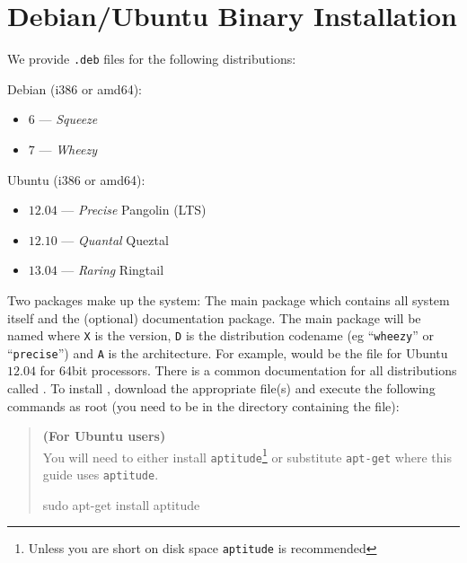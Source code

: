 %
%
%



\chapter{Debian/Ubuntu Binary Installation}\label{chap:bin}

We provide \texttt{.deb} files for the following distributions:

Debian (i386 or amd64):
\begin{itemize}
 \item $6$ --- \emph{Squeeze}
 \item $7$ --- \emph{Wheezy}
\end{itemize}

Ubuntu (i386 or amd64):
\begin{itemize}
 \item $12.04$ --- \emph{Precise} Pangolin (LTS)
 \item $12.10$ --- \emph{Quantal} Queztal 
 \item $13.04$ --- \emph{Raring} Ringtail
\end{itemize}

Two packages make up the \escript system:
The main package which contains all system itself and the (optional) documentation package.
The main package will be named  where \texttt{X} is the version, \texttt{D} 
is the distribution codename (eg ``\texttt{wheezy}'' or ``\texttt{precise}'') and \texttt{A} is the architecture.
For example,  would be the file for Ubuntu $12.04$ for 64bit processors.
There is a common documentation for all distributions called .
To install \esfinley, download the appropriate  file(s) and execute the following 
commands as root (you need to be in the directory containing the file):

\begin{verse}
\textbf{(For Ubuntu users)}\\
You will need to either install \texttt{aptitude}\footnote{Unless you are short on disk space \texttt{aptitude} 
is recommended} or substitute \texttt{apt-get} where this guide uses \texttt{aptitude}.
\begin{shellCode}
sudo apt-get install aptitude
\end{shellCode}
\end{verse}

